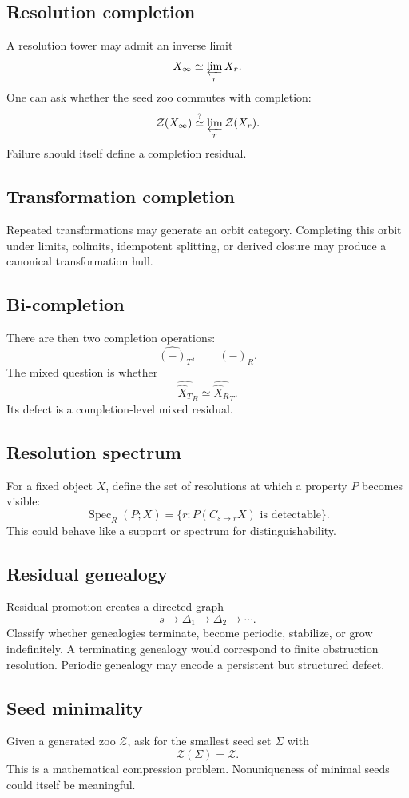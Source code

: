 \documentclass[11pt]{article}
\theoremstyle{definition}
\theoremstyle{remark}
\newcommand{\Zoo}{\mathcal Z}
\newcommand{\Seeds}{\Sigma}
\begin{document}
\subsection{Resolution completion}
A resolution tower may admit an inverse limit
\[
X_\infty\simeq\varprojlim_r X_r.
\]
One can ask whether the seed zoo commutes with completion:
\[
\Zoo(X_\infty)
\stackrel{?}{\simeq}
\varprojlim_r\Zoo(X_r).
\]
Failure should itself define a completion residual.

\subsection{Transformation completion}
Repeated transformations may generate an orbit category. Completing this orbit under limits, colimits, idempotent splitting, or derived closure may produce a canonical transformation hull.

\subsection{Bi-completion}
There are then two completion operations:
\[
\widehat{(-)}_T,
\qquad
\widehat{(-)}_R.
\]
The mixed question is whether
\[
\widehat{\widehat X_T}_R
\simeq
\widehat{\widehat X_R}_T.
\]
Its defect is a completion-level mixed residual.

\subsection{Resolution spectrum}
For a fixed object $X$, define the set of resolutions at which a property $P$ becomes visible:
\[
\operatorname{Spec}_R(P;X)
=
\{r:P(C_{s\to r}X)\text{ is detectable}\}.
\]
This could behave like a support or spectrum for distinguishability.

\subsection{Residual genealogy}
Residual promotion creates a directed graph
\[
s\to\Delta_1\to\Delta_2\to\cdots.
\]
Classify whether genealogies terminate, become periodic, stabilize, or grow indefinitely. A terminating genealogy would correspond to finite obstruction resolution. Periodic genealogy may encode a persistent but structured defect.

\subsection{Seed minimality}
Given a generated zoo $\Zoo$, ask for the smallest seed set $\Seeds$ with
\[
\Zoo(\Seeds)=\Zoo.
\]
This is a mathematical compression problem. Nonuniqueness of minimal seeds could itself be meaningful.
\end{document}
